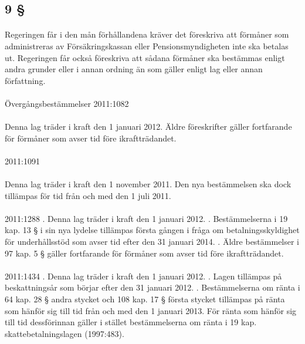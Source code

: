 \documentclass[a4paper,notitlepage,openany,10pt]{book}
\begin{document}
\subsection*{9 §}
\paragraph*{}
Regeringen får i den mån förhållandena kräver det föreskriva att förmåner som administreras av Försäkringskassan eller Pensionsmyndigheten inte ska betalas ut. Regeringen får också föreskriva att sådana förmåner ska bestämmas enligt andra grunder eller i annan ordning än som gäller enligt lag eller annan författning.
\paragraph*{}
Övergångsbestämmelser
2011:1082
\paragraph*{}
Denna lag träder i kraft den 1 januari 2012. Äldre föreskrifter gäller fortfarande för förmåner som avser tid före ikraftträdandet.
\paragraph*{}
2011:1091
\paragraph*{}
Denna lag träder i kraft den 1 november 2011. Den nya bestämmelsen ska dock tillämpas för tid från och med den 1 juli 2011.
\paragraph*{}
2011:1288
. Denna lag träder i kraft den 1 januari 2012.
. Bestämmelserna i 19 kap. 13 § i sin nya lydelse tillämpas första gången i fråga om betalningsskyldighet för underhållsstöd som avser tid efter den 31 januari 2014.
. Äldre bestämmelser i 97 kap. 5 § gäller fortfarande för förmåner som avser tid före ikraftträdandet.
\paragraph*{}
2011:1434
. Denna lag träder i kraft den 1 januari 2012.
. Lagen tillämpas på beskattningsår som börjar efter den 31 januari 2012.
. Bestämmelserna om ränta i 64 kap. 28 § andra stycket och 108 kap. 17 § första stycket tillämpas på ränta som hänför sig till tid från och med den 1 januari 2013. För ränta som hänför sig till tid dessförinnan gäller i stället bestämmelserna om ränta i 19 kap. skattebetalningslagen (1997:483).
\end{document}
